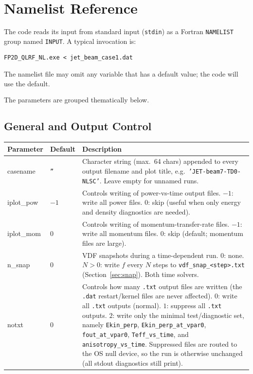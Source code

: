 \documentclass[11pt,a4paper]{article}
\begin{document}
\section{Namelist Reference}
\label{sec:namelist}

The code reads its input from standard input (\texttt{stdin}) as a Fortran
\texttt{NAMELIST} group named \texttt{INPUT}.  A typical invocation is:
\begin{lstlisting}
FP2D_QLRF_NL.exe < jet_beam_case1.dat
\end{lstlisting}
The namelist file may omit any variable that has a default value; the code
will use the default.

\bigskip
The parameters are grouped thematically below.

\subsection{General and Output Control}

\begin{longtable}{>{\ttfamily}p{3.2cm} p{1.5cm} p{9cm}}
\toprule
\normalfont Parameter & Default & Description \\
\midrule
\endhead
\bottomrule
\endlastfoot

casename & \texttt{''} &
  Character string (max.\ 64 chars) appended to every output filename and
  plot title, e.g.\ \texttt{'JET-beam7-TD0-NLSC'}.  Leave empty for
  unnamed runs. \\[4pt]

iplot\_pow & $-1$ &
  Controls writing of power-vs-time output files.
  $-1$: write all power files.
  $0$: skip (useful when only energy and density diagnostics are needed). \\[4pt]

iplot\_mom & $0$ &
  Controls writing of momentum-transfer-rate files.
  $-1$: write all momentum files.
  $0$: skip (default; momentum files are large). \\[4pt]

n\_snap & $0$ &
  VDF snapshots during a time-dependent run.
  $0$: none.
  $N > 0$: write $f$ every $N$ steps to \texttt{vdf\_snap\_<step>.txt}
  (Section~\ref{sec:snap}).  Both time solvers. \\[4pt]

notxt & $0$ &
  Controls how many \texttt{.txt} output files are written (the \texttt{.dat}
  restart/kernel files are never affected).
  $0$: write all \texttt{.txt} outputs (normal).
  $1$: suppress all \texttt{.txt} outputs.
  $2$: write only the minimal test/diagnostic set, namely
  \texttt{Ekin\_perp}, \texttt{Ekin\_perp\_at\_vpar0}, \texttt{fout\_at\_vpar0},
  \texttt{Teff\_vs\_time}, and \texttt{anisotropy\_vs\_time}.
  Suppressed files are routed to the OS null device, so the run is otherwise
  unchanged (all stdout diagnostics still print). \\[4pt]

\end{longtable}
\end{document}
